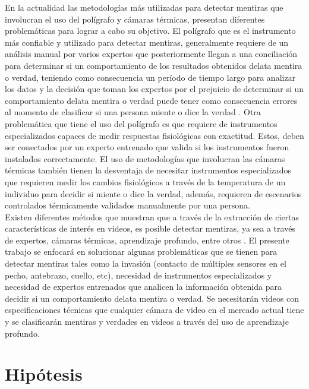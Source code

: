 \begin{onehalfspacing}
En la actualidad las metodologías más utilizadas para detectar mentiras que involucran el uso del polígrafo y cámaras térmicas, presentan diferentes problemáticas para lograr a cabo su objetivo. El polígrafo que es el instrumento más confiable y utilizado para detectar mentiras, generalmente requiere de un análisis manual por varios expertos que posteriormente llegan a una conciliación para determinar si un comportamiento de los resultados obtenidos delata mentira o verdad, teniendo como consecuencia un período de tiempo largo para analizar los datos y la decisión que toman los expertos por el prejuicio de determinar si un comportamiento delata mentira o verdad puede tener como consecuencia errores al momento de clasificar si una persona miente o dice la verdad \cite{Tsiamyrtzis2005LieVideo}. Otra problemática que tiene el uso del polígrafo es que requiere de instrumentos especializados capaces de medir respuestas fisiológicas con exactitud. Estos, deben ser conectados por un experto entrenado que valida si los instrumentos fueron instalados correctamente. El uso de metodologías que involucran las cámaras térmicas también tienen la desventaja de necesitar instrumentos especializados que requieren medir los cambios fisiológicos a través de la temperatura de un individuo para decidir si miente o dice la verdad, además, requieren de escenarios controlados térmicamente validados manualmente por una persona.\\

Existen diferentes métodos que muestran que a través de la extracción de ciertas características de interés en videos, es posible detectar mentiras, ya sea a través de expertos, cámaras térmicas, aprendizaje profundo, entre otros \cite{KrishnamurthyADetection,Abouelenien2016AnalyzingApproach,Rajoub2014ThermalDetection,Warmelink2011ThermalAirports,Grubin2005LieReview,Yang2017DeepImages}. El presente trabajo se enfocará en solucionar algunas problemáticas que se tienen para detectar mentiras tales como la invasión (contacto de múltiples sensores en el pecho, antebrazo, cuello, etc), necesidad de instrumentos especializados y necesidad de expertos entrenados que analicen la información obtenida para decidir si un comportamiento delata mentira o verdad. Se necesitarán videos con especificaciones técnicas que cualquier cámara de video en el mercado actual tiene y se clasificarán mentiras y verdades en videos a través del uso de aprendizaje profundo.\\


\section{Hipótesis}
\label{sec:Hipotesis}


\end{onehalfspacing}
